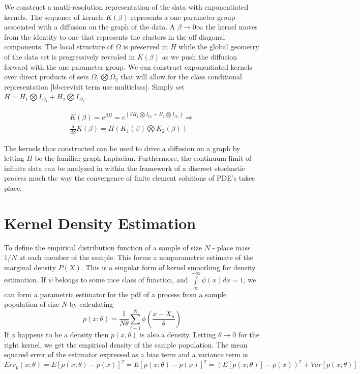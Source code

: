 \documentclass[a4paper]{article}
\theoremstyle{plain}
\theoremstyle{definition}
\theoremstyle{remark}
\numberwithin{equation}{section}
\begin{document}
We construct a mutli-resolution representation of the data with exponentiated kernels.  The sequence of kernels $K(\beta)$ represents a one parameter group associated with a diffusion on the graph of the data.  A $\beta \rightarrow  0 \infty$ the kernel moves from the identity to one that represents the clusters in the off diagonal components.  The local structure of $\Omega$ is preserved in $H$ while the global geometry of the data set is progressively revealed in $K(\beta)$ as we push the diffusion forward with the one parameter group.  We can construct exponentiated kernels over direct products of sets $\Omega_1 \bigotimes \Omega_2$ that will allow for the class conditional representation [bbcrevisit term use multiclass].  Simply set $H = H_1 \bigotimes I_{\Omega_1} +  H_2 \bigotimes I_{\Omega_2}$.
\begin{center}\begin{eqnarray*}
K(\beta) = e^{\beta H} =  e^{(\beta H_1 \bigotimes I_{\Omega_1} +  H_2 \bigotimes I_{\Omega_2})} \Rightarrow \\
\frac{d}{d \beta} K(\beta) =  H (K_1(\beta) \bigotimes K_2(\beta))
\end{eqnarray*}\end{center}

The kernels thus  constructed can be used to drive a diffusion on a graph by letting $H$ be the familiar graph Laplacian.  Furthermore, the continuum limit of infinite data can be analyzed in within the framework of a discreet stochastic process much the way the convergence of finite element solutions of PDE's takes place.


\section{Kernel Density Estimation}
To define the empirical distribution function of a sample of size $N$ - place mass $1/N$ at each member of the sample.  This forms a nonparametric estimate of the marginal density $P(X)$.  This is a singular form of kernel smoothing for density estimation.  If $\psi$ belongs to some nice class of function, and $\int\limits_{\infty}^{-\infty}\psi(x) dx = 1$, we can form a parametric estimator for the pdf of a process from a sample
population of size $N$ by calculating
\begin{equation*} p(x;\theta)=\frac{1}{N \theta}
\sum\limits_{i-1}^{N} \phi( \frac{x-X_n}{\theta})
\end{equation*}
If $\phi$ happens to be a density then $p(x,\theta)$ is also a density.  Letting $\theta \rightarrow 0$ for the right kernel, we get the empirical density of the sample population.  The mean squared error of the estimator expressed as a bias term and a variance term is
\begin{equation*} Err_p(x;\theta)= E[p(x;\theta)-p(x)]^2 =  E[ p(x;\theta)-p(x)]^2 =
(E[p(x;\theta)]-p(x))^2 + Var[ p(x;\theta)]
\end{equation*}
\end{document}
